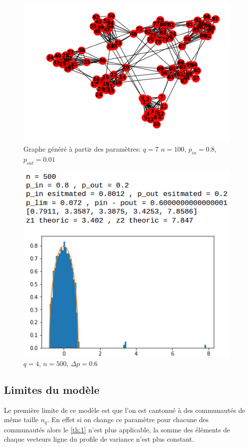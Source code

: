 \begin{figure}[H]
\centering
\includegraphics[scale=0.6]{static/graph_q7_n100_pin08_pout0011.png}
\caption{Graphe généré à partir des paramètres: $q=7$ $n=100$, $p_{in}=0.8$, $p_{out}=0.01$}
\end{figure}
\begin{figure}[H]
\centering
\includegraphics[scale=0.6]{static/spectral_q4_n500_pin08_pout02}
\caption{$q=4$, $n=500$, $\Delta p=0.6$}
\label{n500delta-05}
\end{figure}
\subsection{Limites du modèle}
Le première limite de ce modèle est que l'on est cantonné à des communautés de même taille $n_q$.
En effet si on change ce paramètre pour chacune des communautés alors le \autoref{th:1} n'est plus applicable, la somme des éléments de chaque vecteurs ligne du profile de variance n'est plus constant.\\

